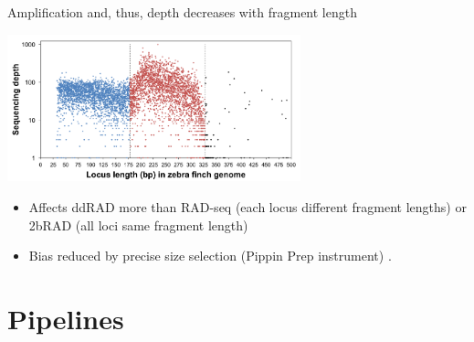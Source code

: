 \documentclass[presentation]{beamer}
\begin{document}
\begin{frame}[label=sec-3-3-4]{Amplification and, thus, depth decreases with fragment length}
\begin{center}
\includegraphics[width=8.5cm]{DaCosta2014Fig1b.png}

\tiny{\citep{Dacosta2014}}
\end{center}
\begin{itemize}
\item Affects ddRAD more than RAD-seq (each locus different fragment lengths) or 2bRAD (all loci same fragment length)
\end{itemize}
\begin{itemize}
\item Bias reduced by precise size selection (Pippin Prep instrument)
\citep{Dacosta2014}.
\end{itemize}
\end{frame}




\section{Pipelines}
\label{sec-4}
\end{document}
